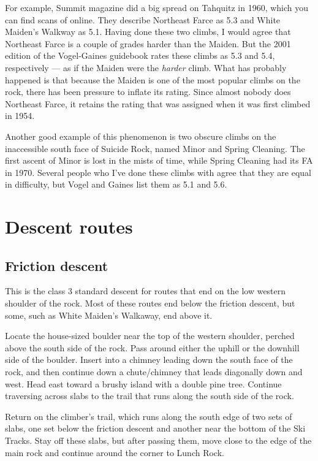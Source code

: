 \documentclass{tahquitz}
\begin{document}
For example,
Summit magazine did a big spread on Tahquitz in 1960, which you can find scans of online.
They describe Northeast Farce as 5.3 and White Maiden's Walkway as 5.1. Having done
these two climbs, I would agree that Northeast Farce is a couple of grades harder
than the Maiden. But the 2001 edition
of the Vogel-Gaines guidebook rates these climbs as 5.3 and 5.4, respectively --- as if
the Maiden were the \emph{harder} climb. What has
probably happened is that because the Maiden is one of the most popular climbs on
the rock, there has been pressure to inflate its rating. Since almost nobody does Northeast
Farce, it retains the rating that was assigned when it was first climbed in 1954.

Another good example of this phenomenon is two obscure climbs on the inaccessible
south face of Suicide Rock, named Minor and Spring Cleaning. The first ascent of Minor is
lost in the mists of time, while Spring Cleaning had its FA in 1970. Several people who
I've done these climbs with agree that they are equal in difficulty, but Vogel and Gaines
list them as 5.1 and 5.6.

\pagebreak

\section{Descent routes}

\subsection{Friction descent}\label{subsec:friction-descent}

This is the class 3 standard descent for routes that end on the low western shoulder of the rock.
Most of these routes end below the friction descent, but some, such as White Maiden's Walkaway,
end above it.

Locate the house-sized boulder near the top of the western shoulder,
perched above the south side of the rock. Pass around either the
uphill or the downhill side of the boulder. Insert into a chimney
leading down the south face of the rock, and then continue down a
chute/chimney that leads diagonally down and west.  Head east toward a
brushy island with a double pine tree. Continue traversing across
slabs to the trail that runs along the south side of the rock.

Return on the climber's trail, which runs along the south edge of
two sets of slabs, one set below the friction descent
and another near the bottom of the Ski Tracks. Stay off these slabs,
but after passing them, move close to the edge of the main rock
and continue around the corner to Lunch Rock.
\end{document}
